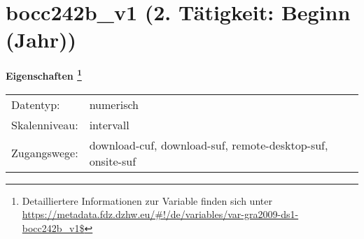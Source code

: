 
    \setcounter{footnote}{0}

    \vspace*{-1.8cm}
	\section{bocc242b\_v1 (2. Tätigkeit: Beginn (Jahr))}
	\label{section:bocc242b_v1}



    \vspace*{0.5cm}
    \noindent\textbf{Eigenschaften
	\footnote{Detailliertere Informationen zur Variable finden sich unter
		\url{https://metadata.fdz.dzhw.eu/\#!/de/variables/var-gra2009-ds1-bocc242b_v1$}}}\\
	\begin{tabularx}{\hsize}{@{}lX}
	Datentyp: & numerisch \\
	Skalenniveau: & intervall \\
	Zugangswege: &
	  download-cuf, 
	  download-suf, 
	  remote-desktop-suf, 
	  onsite-suf
 \\
    \end{tabularx}



